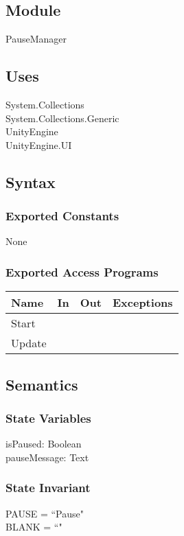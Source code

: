 \documentclass[12pt, titlepage]{article}
\begin{document}
\subsection{Module}

PauseManager

\subsection{Uses}
System.Collections\\
System.Collections.Generic\\
UnityEngine\\
UnityEngine.UI\\

\subsection{Syntax}

\subsubsection{Exported Constants}
None
\subsubsection{Exported Access Programs}

\begin{center}
\begin{tabular}{|l|l|l|p{5cm}|}
\hline
\textbf{Name} & \textbf{In} & \textbf{Out} & \textbf{Exceptions} \\
\hline
Start &  &  &  \\
\hline
Update & & & \\
\hline
\end{tabular}
\end{center}

\subsection{Semantics}

\subsubsection{State Variables}
isPaused: Boolean\\
pauseMessage: Text
\subsubsection{State Invariant}
PAUSE = ``Pause"\\
BLANK = ``"
\end{document}
